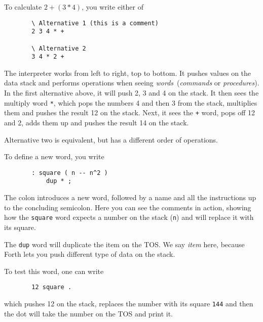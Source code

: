To calculate $2 + (3 * 4)$, you write either of

\begin{figure}[H]
  \centering
  \begin{Verbatim}
  \ Alternative 1 (this is a comment)
  2 3 4 * +

  \ Alternative 2
  3 4 * 2 +
  \end{Verbatim}
\end{figure}

The interpreter works from left to right, top to bottom. It pushes values on
the data stack and performs operations when seeing
\textit{words} (\textit{commands} or \textit{procedures}).  In the first
alternative above, it will push 2, 3 and 4 on the stack.
  It then sees the multiply word \texttt{*}, which pops the
numbers 4 and then 3 from the stack, multiplies them and pushes the result
12 on the stack.  Next, it sees the \texttt{+} word,
pops off 12 and 2, adds them up and pushes the result 14 on the stack.

Alternative two is equivalent, but has a different order of operations.

To define a new word, you write

\begin{figure}[H]
  \centering
  \begin{Verbatim}
  : square ( n -- n^2 )
      dup * ;
  \end{Verbatim}
\end{figure}

The colon introduces a new word, followed by a name and all the instructions
up to the concluding semicolon.  Here you can see the comments in action,
showing how the \texttt{square} word expects a number on the stack
(\texttt{n}) and will replace it with its square.

The \texttt{dup} word will duplicate the item on the \ac{TOS}.  We
say \textit{item} here, because Forth lets you push different type of data
on the stack.

To test this word, one can write 

\begin{figure}[H]
  \centering
  \begin{Verbatim}
  12 square .
  \end{Verbatim}
\end{figure}

which pushes 12 on the stack, replaces the number with its square
\texttt{144} and then the dot will take the number on the \ac{TOS}
and print it.

